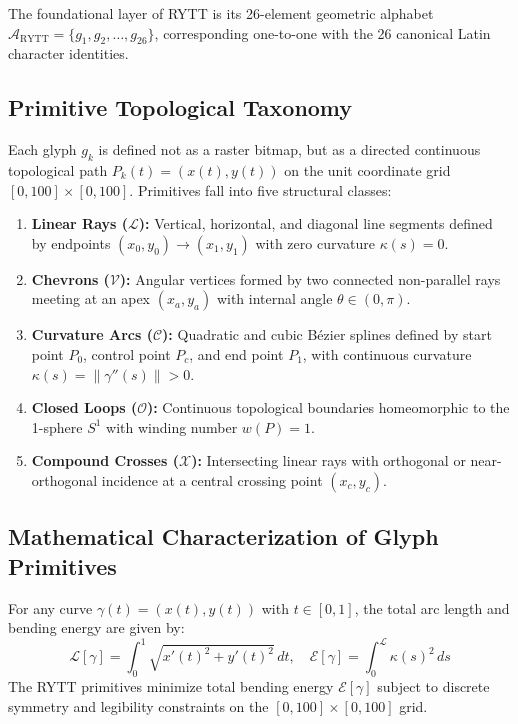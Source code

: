 \documentclass[11pt,oneside,letterpaper]{article}
\theoremstyle{definition}
\begin{document}
The foundational layer of RYTT is its 26-element geometric alphabet $\mathcal{A}_{\text{RYTT}} = \{g_1, g_2, \dots, g_{26}\}$, corresponding one-to-one with the 26 canonical Latin character identities. 

\subsection{Primitive Topological Taxonomy}
Each glyph $g_k$ is defined not as a raster bitmap, but as a directed continuous topological path $P_k(t) = (x(t), y(t))$ on the unit coordinate grid $[0, 100] \times [0, 100]$. Primitives fall into five structural classes:
\begin{enumerate}
  \item \textbf{Linear Rays ($\mathcal{L}$):} Vertical, horizontal, and diagonal line segments defined by endpoints $(x_0, y_0) \to (x_1, y_1)$ with zero curvature $\kappa(s) = 0$.
  \item \textbf{Chevrons ($\mathcal{V}$):} Angular vertices formed by two connected non-parallel rays meeting at an apex $(x_a, y_a)$ with internal angle $\theta \in (0, \pi)$.
  \item \textbf{Curvature Arcs ($\mathcal{C}$):} Quadratic and cubic Bézier splines defined by start point $P_0$, control point $P_c$, and end point $P_1$, with continuous curvature $\kappa(s) = \|\gamma''(s)\| > 0$.
  \item \textbf{Closed Loops ($\mathcal{O}$):} Continuous topological boundaries homeomorphic to the 1-sphere $S^1$ with winding number $w(P) = 1$.
  \item \textbf{Compound Crosses ($\mathcal{X}$):} Intersecting linear rays with orthogonal or near-orthogonal incidence at a central crossing point $(x_c, y_c)$.
\end{enumerate}

\subsection{Mathematical Characterization of Glyph Primitives}
For any curve $\gamma(t) = (x(t), y(t))$ with $t \in [0, 1]$, the total arc length and bending energy are given by:
\begin{equation}
\mathcal{L}[\gamma] = \int_0^1 \sqrt{x'(t)^2 + y'(t)^2} \, dt, \quad \mathcal{E}[\gamma] = \int_0^{\mathcal{L}} \kappa(s)^2 \, ds
\end{equation}
The RYTT primitives minimize total bending energy $\mathcal{E}[\gamma]$ subject to discrete symmetry and legibility constraints on the $[0, 100] \times [0, 100]$ grid.
\end{document}
